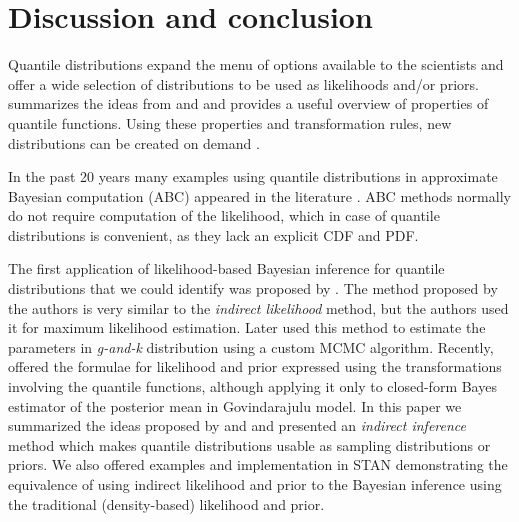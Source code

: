 \documentclass[
  12pt,
]{article}
\begin{document}
\hypertarget{discussion-and-conclusion}{%
\section{Discussion and conclusion}\label{discussion-and-conclusion}}

Quantile distributions expand the menu of options available to the scientists and offer a wide selection of distributions to be used as likelihoods and/or priors. \citet{hadlock2017QuantileparameterizedMethodsQuantifying} summarizes the ideas from \citet{gilchrist2000StatisticalModellingQuantile} and \citet{powley2013QuantileFunctionMethods} and provides a useful overview of properties of quantile functions. Using these properties and transformation rules, new distributions can be created on demand \citep{rodrigues2020FlexibleProcedureFormulating, midhu2014ClassDistributionsLinear, sankaran2016NewQuantileFunction, sankaran2018NewClassQuantile, yang2009QuantileBasedDistributionsModelling, smithson2017CDFquantileDistributionsModelling}.

In the past 20 years many examples using quantile distributions in approximate Bayesian computation (ABC) appeared in the literature \citetext{\citealp{allingham2009BayesianEstimationQuantile}; \citealp{drovandi2011LikelihoodfreeBayesianEstimation}; \citealp{dunson2005ApproximateBayesianInference}; \citealp{mcvinish2012ImprovingABCQuantile}; \citealp[and][]{smithson2017CDFquantileDistributionsModelling}}. ABC methods normally do not require computation of the likelihood, which in case of quantile distributions is convenient, as they lack an explicit CDF and PDF.

The first application of likelihood-based Bayesian inference for quantile distributions that we could identify was proposed by \citet{rayner2002NumericalMaximumLikelihood}. The method proposed by the authors is very similar to the \emph{indirect likelihood} method, but the authors used it for maximum likelihood estimation. Later \citet{haynes2005BayesianEstimationGandk} used this method to estimate the parameters in \emph{g-and-k} distribution using a custom MCMC algorithm. Recently, \citet{nair2020BayesianInferenceQuantile} offered the formulae for likelihood and prior expressed using the transformations involving the quantile functions, although applying it only to closed-form Bayes estimator of the posterior mean in Govindarajulu model. In this paper we summarized the ideas proposed by \citet{rayner2002NumericalMaximumLikelihood} and \citet{nair2020BayesianInferenceQuantile} and presented an \emph{indirect inference} method which makes quantile distributions usable as sampling distributions or priors. We also offered examples and implementation in STAN demonstrating the equivalence of using indirect likelihood and prior to the Bayesian inference using the traditional (density-based) likelihood and prior.
\end{document}
